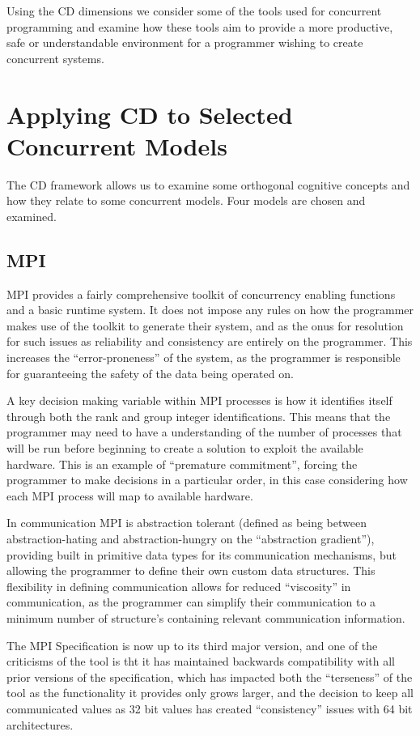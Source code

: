 \documentclass{sig-alternate}
\begin{document}
Using the CD dimensions we consider some of the tools used for concurrent programming and examine how these tools aim to provide a more productive, safe or understandable environment for a programmer wishing to create concurrent systems.

\section{Applying CD to Selected Concurrent Models}
The CD framework allows us to examine some orthogonal cognitive concepts and how they relate to some concurrent models. Four models are chosen and examined.

\subsection{MPI}
MPI provides a fairly comprehensive toolkit of concurrency enabling functions and a basic runtime system. It does not impose any rules on how the programmer makes use of the toolkit to generate their system, and as the onus for resolution for such issues as reliability and consistency are entirely on the programmer. This increases the ``error-proneness'' of the system, as the programmer is responsible for guaranteeing the safety of the data being operated on.

A key decision making variable within MPI processes is how it identifies itself through both the rank and group integer identifications. This means that the programmer may need to have a understanding of the number of processes that will be run before beginning to create a solution to exploit the available hardware. This is an example of ``premature commitment'', forcing the programmer to make decisions in a particular order, in this case considering how each MPI process will map to available hardware.

In communication MPI is abstraction tolerant (defined as being between abstraction-hating and abstraction-hungry on the ``abstraction gradient''), providing built in primitive data types for its communication mechanisms, but allowing the programmer to define their own custom data structures. This flexibility in defining communication allows for reduced ``viscosity'' in communication, as the programmer can simplify their communication to a minimum number of structure's containing relevant communication information.

The MPI Specification is now up to its third major version, and one of the criticisms of the tool is tht it has maintained backwards compatibility with all prior versions of the specification, which has impacted both the ``terseness'' of the tool as the functionality it provides only grows larger, and the decision to keep all communicated values as 32 bit values has created ``consistency'' issues with 64 bit architectures.
\end{document}
